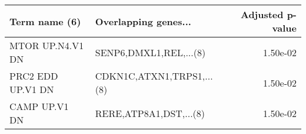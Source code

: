 \begin{tabular}{llr}
\toprule
    Term name (6) &      Overlapping genes... &  Adjusted p-value \\
\midrule
 MTOR UP.N4.V1 DN &    SENP6,DMXL1,REL,...(8) &          1.50e-02 \\
PRC2 EDD UP.V1 DN & CDKN1C,ATXN1,TRPS1,...(8) &          1.50e-02 \\
    CAMP UP.V1 DN &    RERE,ATP8A1,DST,...(8) &          1.50e-02 \\
\bottomrule
\end{tabular}
